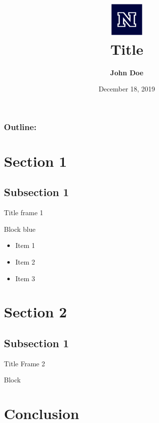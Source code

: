 \documentclass[xcolor=dvipsnames, hyperref=hidelinks, url=hyphens]{beamer}
\title[Title]{\includegraphics[height=1.7cm]{images/nevada-blockn-blue.eps}\\Title\vspace{-2ex}} %
\author[John Doe]{ \textbf{John Doe}}
\institute[UNR]{University of Nevada, Reno}
\date{December 18, 2019}
\begin{document}
{
\begin{frame}
\vspace{6em}%
  \titlepage
\end{frame}
}
\begin{frame}
\frametitle{\textbf{Outline:}}
\tableofcontents
\end{frame}

		
  
    \section{Section 1}  
    \subsection{Subsection 1}
     \begin{frame}{Title frame 1}
            \begin{block}{Block blue}
    		\begin{itemize}
    		\item Item 1
    		\item Item 2
    		\item Item 3
  			\end{itemize}
        \end{block}  
     \end{frame}
          
   \section{Section 2}
   \subsection{Subsection 1}
     \begin{frame}{Title Frame 2}
        \begin{block}{Block}
            \lipsum[2]
        \end{block}
     \end{frame}
     
     
     
\section{Conclusion}
\end{document}
